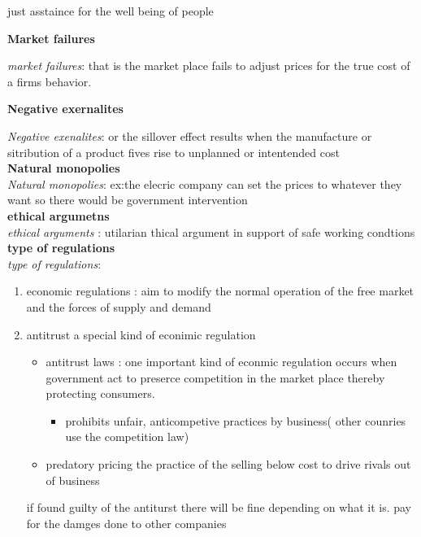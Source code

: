 \documentclass{article}
\begin{document}
just asstaince for the well being of people 

\textbf{\huge Market failures}

\textit{market failures}: that is the market place fails to adjust  prices for the true cost  of a firms behavior.

\textbf{\huge Negative exernalites}
  
 \textit{Negative exenalites}: or the sillover effect results  when the manufacture or sitribution of a product fives rise to unplanned or intentended cost \\
\textbf{\huge Natural monopolies}\\
 \textit{Natural monopolies}: ex:the elecric company can set the prices  to whatever they want so there would be government intervention \\
  \textbf{\huge ethical argumetns }\\
  \textit{ethical arguments }: utilarian thical argument  in support of safe working condtions\\ 
  
  \textbf{\huge type of regulations }\\ 
   \textit{type of regulations}:
   \begin{enumerate}
   \item economic regulations : aim to modify the normal operation of the free market and the forces of supply and demand 
   \item antitrust a special kind of econimic regulation 
   \begin{itemize}
   \item antitrust laws : one important  kind of econmic regulation occurs when government act to preserce competition in the market place thereby protecting consumers.
   \begin{itemize}
   \item prohibits unfair, anticompetive  practices by business( other counries use the competition law)
 
   \end{itemize}
   \item predatory pricing the practice of the selling below cost to drive rivals out of business 
  \end{itemize} 
  
  if found guilty of the antiturst there will be fine depending on what it is. pay for the damges done to other companies 
  
    
   
   \end{enumerate}
   
\end{document}
